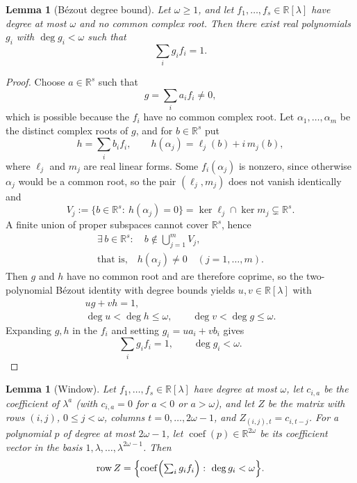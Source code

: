\documentclass[journal]{IEEEtran}
\theoremstyle{plainn}
\newtheorem{lem}[thm]{Lemma}
\theoremstyle{remark}
\begin{document}
\begin{lem}[B\'ezout degree bound]\label{lem:bezout}\label{sec:bezout}
	Let $\omega\ge1$, and let $f_1,\ldots,f_s\in\mathbb R[\lambda]$ have
	degree at most $\omega$ and no common complex root. Then there exist
	real polynomials $g_i$ with $\deg g_i<\omega$ such that
	\[
	\sum_i g_i f_i=1 .
	\]
\end{lem}

\begin{proof}
	Choose $a\in\mathbb R^s$ such that
	\[
	g=\sum_i a_if_i\neq0,
	\]
	which is possible because the $f_i$ have no common complex root. Let
	$\alpha_1,\dots,\alpha_m$ be the distinct complex roots of $g$, and for
	$b\in\mathbb R^s$ put
	\[
	h=\sum_i b_if_i,\qquad
	h(\alpha_j)=\ell_j(b)+i\,m_j(b),
	\]
	where $\ell_j$ and $m_j$ are real linear forms. Some $f_i(\alpha_j)$ is
	nonzero, since otherwise $\alpha_j$ would be a common root, so the pair
	$(\ell_j,m_j)$ does not vanish identically and
	\[
	V_j:=\{b\in\mathbb R^s:\ h(\alpha_j)=0\}
	=\ker\ell_j\cap\ker m_j\subsetneq\mathbb R^s .
	\]
	A finite union of proper subspaces cannot cover $\mathbb R^s$, hence
	\[
	\begin{gathered}
	\exists\,b\in\mathbb R^s:\quad b\notin\bigcup_{j=1}^{m}V_j,\\
	\text{that is,}\quad h(\alpha_j)\neq0\quad (j=1,\dots,m).
	\end{gathered}
	\]
	Then $g$ and $h$ have no common root and are therefore coprime, so the two-polynomial
	B\'ezout identity with degree bounds \cite[Ch.~3]{vzgg13} yields
	$u,v\in\mathbb R[\lambda]$ with
	\[
	\begin{gathered}
	ug+vh=1,\\
	\deg u<\deg h\le\omega,\qquad \deg v<\deg g\le\omega .
	\end{gathered}
	\]
	Expanding $g,h$ in the $f_i$ and setting $g_i=ua_i+vb_i$ gives
	\[
	\sum_i g_i f_i=1,\qquad \deg g_i<\omega .
	\]
\end{proof}

\begin{lem}[Window]\label{lem:window}
	Let $f_1,\dots,f_s\in\mathbb R[\lambda]$ have degree at most $\omega$,
	let $c_{i,a}$ be the coefficient of $\lambda^a$ (with $c_{i,a}=0$ for
	$a<0$ or $a>\omega$), and let $Z$ be the matrix with rows $(i,j)$,
	$0\le j<\omega$, columns $t=0,\dots,2\omega-1$, and
	$Z_{(i,j),t}=c_{i,t-j}$. For a polynomial $p$ of degree at most
	$2\omega-1$, let $\operatorname{coef}(p)\in\mathbb R^{2\omega}$ be its
	coefficient vector in the basis $1,\lambda,\dots,\lambda^{2\omega-1}$.
	Then
	\[
	\operatorname{row}Z=
	\Bigl\{
	\operatorname{coef}\Bigl(\textstyle\sum_i g_if_i\Bigr)
	:\ \deg g_i<\omega
	\Bigr\}.
	\]
\end{lem}
\end{document}
